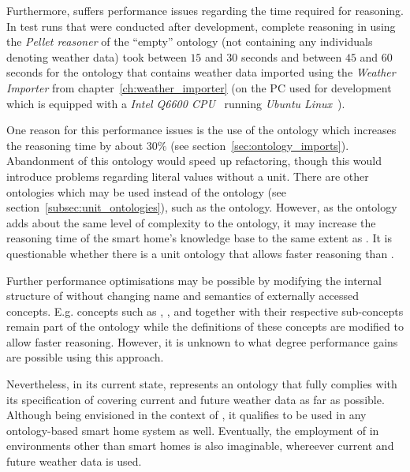 Furthermore, \smarthomeweather suffers performance issues regarding the time required for reasoning. In test runs that were conducted after development, complete reasoning in \protege using the \emph{Pellet reasoner} of the ``empty'' ontology (not containing any individuals denoting weather data) took between $15$ and $30$ seconds and between $45$ and $60$ seconds for the ontology that contains weather data imported using the \emph{Weather Importer} from chapter~\ref{ch:weather_importer} (on the PC used for development which is equipped with a \emph{Intel Q6600 CPU}~\cite{intel_q6600} running \emph{Ubuntu Linux}~\cite{ubuntu}).

One reason for this performance issues is the use of the \muo ontology which increases the reasoning time by about $30 \%$ (see section~\ref{sec:ontology_imports}). Abandonment of this ontology would speed up refactoring, though this would introduce problems regarding literal values without a unit. There are other ontologies which may be used instead of the \muo ontology (see section~\ref{subsec:unit_ontologies}), such as the  ontology. However, as the  ontology adds about the same level of complexity to the ontology, it may increase the reasoning time of the smart home's knowledge base to the same extent as \muo. It is questionable whether there is a unit ontology that allows faster reasoning than \muo.

Further performance optimisations may be possible by modifying the internal structure of \smarthomeweather without changing name and semantics of externally accessed concepts. E.g. concepts such as , , and  together with their respective sub-concepts remain part of the ontology while the definitions of these concepts are modified to allow faster reasoning. However, it is unknown to what degree performance gains are possible using this approach.

\vspace{1cm}

Nevertheless, in its current state, \smarthomeweather represents an ontology that fully complies with its specification of covering current and future weather data as far as possible. Although being envisioned in the context of \thinkhome, it qualifies to be used in any ontology-based smart home system as well. Eventually, the employment of \smarthomeweather in environments other than smart homes is also imaginable, whereever current and future weather data is used.
